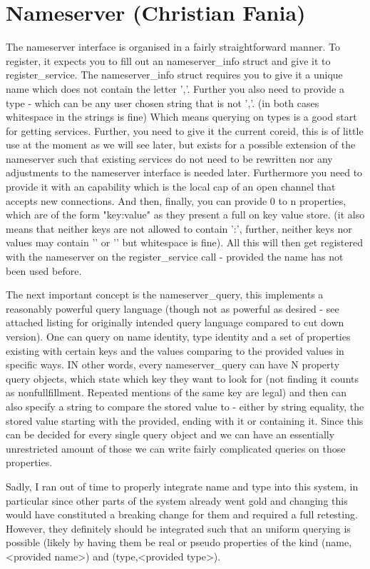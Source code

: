 \section{Nameserver (Christian Fania)}\label{s:nameserver}
The nameserver interface is organised in a fairly straightforward manner.
To register, it expects you to fill out an nameserver\_info struct and give it to register\_service.
The nameserver\_info struct requires you to give it a unique name which does not contain the letter ','. Further you also need to provide a type - which can be any user chosen string that is not ','. (in both cases whitespace in the strings is fine) Which means querying on types is a good start for getting services.
Further, you need to give it the current coreid, this is of little use at the moment as we will see later, but exists for a possible extension of the nameserver such that existing services do not need to be rewritten nor any adjustments to the nameserver interface is needed later.
Furthermore you need to provide it with an capability which is the local cap of an open channel that accepts new connections.
And then, finally, you can provide 0 to n properties, which are of the form "key:value" as they present a full on key value store. (it also means that neither keys are not allowed to contain ':', further, neither keys nor values may contain '{' or '}' but whitespace is fine). All this will then get registered with the nameserver on the register\_service call - provided the name has not been used before.
\medskip

The next important concept is the nameserver\_query, this implements a reasonably powerful query language (though not as powerful as desired - see attached listing for originally intended query language compared to cut down version). One can query on name identity, type identity and a set of properties existing with certain keys and the values comparing to the provided values in specific ways.
IN other words, every nameserver\_query can have N property query objects, which state which key they want to look for (not finding it counts as nonfullfillment. Repeated mentions of the same key are legal) and then can also specify a string to compare the stored value to - either by string equality, the stored value starting with the provided, ending with it or containing it.
Since this can be decided for every single query object and we can have an essentially unrestricted amount of those we can write fairly complicated queries on those properties. 
\medskip

Sadly, I ran out of time to properly integrate name and type into this system, in particular since other parts of the system already went gold and changing this would have constituted a breaking change for them and required a full retesting. However, they definitely should be integrated such that an uniform querying is possible (likely by having them be real or pseudo properties of the kind (name,<provided name>) and (type,<provided type>).
\medskip

